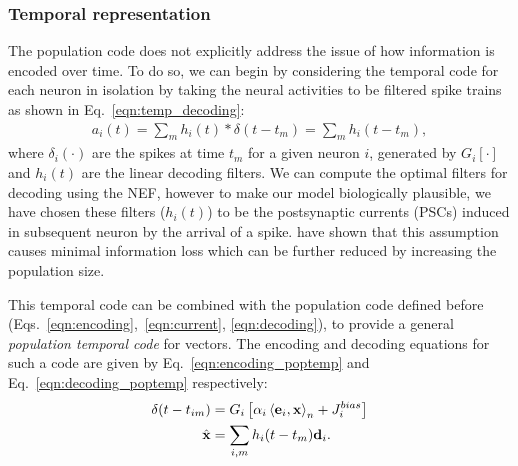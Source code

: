 \documentclass[10pt,letterpaper]{article}
\renewcommand{\vec}[1]{{\bf {#1}}}
\newcommand{\dotp}[3]{\left\langle {#1}, {#2} \right\rangle_{#3}}
\newcommand{\lif}[2]{G_{#1} \left[ {#2} \right]}
\begin{document}
\subsubsection{Temporal representation} %
The population code does not explicitly address the issue of how information is encoded over time. To do so, we can begin by considering the temporal code for each neuron in isolation by taking the neural activities to be filtered spike trains as shown in Eq.~\ref{eqn:temp_decoding}:
\begin{equation}
\label{eqn:temp_decoding}
\begin{aligned}
a_i(t) = \sum_m h_i(t) \ast \delta(t-t_m) = \sum_m h_i(t-t_m) ,
\end{aligned}
\end{equation}
where $\delta_i(\cdot)$ are the spikes at time $t_m$ for a given neuron $i$, generated by $\lif{i}{\cdot}$ and $h_i(t)$ are the linear decoding filters. We can compute the optimal filters for decoding using the NEF, however to make our model biologically plausible, we have chosen these filters ($h_i(t)$) to be the postsynaptic currents (PSCs) induced in subsequent neuron by the arrival of a spike.  have shown that this assumption causes minimal information loss which can be further reduced by increasing the population size. 

This temporal code can be combined with the population code defined before (Eqs.~\ref{eqn:encoding},~\ref{eqn:current}, \ref{eqn:decoding}), to provide a general \textit{population temporal code} for vectors. The encoding and decoding equations for such a code are given by Eq.~\ref{eqn:encoding_poptemp} and Eq.~\ref{eqn:decoding_poptemp} respectively:
\begin{align}
\delta(t-t_{im}) &= \lif{i}{\alpha_i \dotp{\vec{e}_i}{\vec{x}}{n} + J_i^{bias}} \label{eqn:encoding_poptemp} \\
\hat{\vec{x}} &= \sum_{i,m} h_i(t-t_m) \vec{d}_i . \label{eqn:decoding_poptemp}
\end{align}
\end{document}
